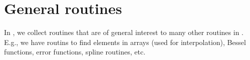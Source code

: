 
\section{General routines}

In , we collect routines that are of general interest to
many other routines in \ds. E.g., we have routins to find elements in
arrays (used for interpolation), Bessel functions, error functions,
spline routines, etc.
